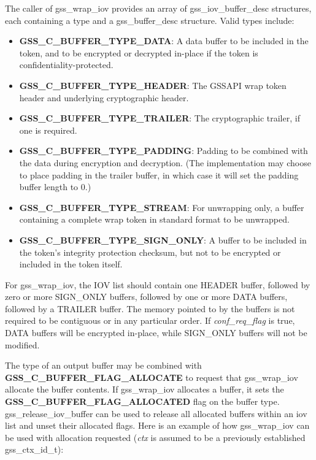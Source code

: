 \documentclass[letterpaper,10pt,english]{sphinxmanual}
\begin{document}
The caller of gss\_wrap\_iov provides an array of gss\_iov\_buffer\_desc
structures, each containing a type and a gss\_buffer\_desc structure.
Valid types include:
\begin{itemize}
\item {} 
\textbf{GSS\_C\_BUFFER\_TYPE\_DATA}: A data buffer to be included in the
token, and to be encrypted or decrypted in-place if the token is
confidentiality-protected.

\item {} 
\textbf{GSS\_C\_BUFFER\_TYPE\_HEADER}: The GSSAPI wrap token header and
underlying cryptographic header.

\item {} 
\textbf{GSS\_C\_BUFFER\_TYPE\_TRAILER}: The cryptographic trailer, if one is
required.

\item {} 
\textbf{GSS\_C\_BUFFER\_TYPE\_PADDING}: Padding to be combined with the data
during encryption and decryption.  (The implementation may choose to
place padding in the trailer buffer, in which case it will set the
padding buffer length to 0.)

\item {} 
\textbf{GSS\_C\_BUFFER\_TYPE\_STREAM}: For unwrapping only, a buffer
containing a complete wrap token in standard format to be unwrapped.

\item {} 
\textbf{GSS\_C\_BUFFER\_TYPE\_SIGN\_ONLY}: A buffer to be included in the
token's integrity protection checksum, but not to be encrypted or
included in the token itself.

\end{itemize}

For gss\_wrap\_iov, the IOV list should contain one HEADER buffer,
followed by zero or more SIGN\_ONLY buffers, followed by one or more
DATA buffers, followed by a TRAILER buffer.  The memory pointed to by
the buffers is not required to be contiguous or in any particular
order.  If \emph{conf\_req\_flag} is true, DATA buffers will be encrypted
in-place, while SIGN\_ONLY buffers will not be modified.

The type of an output buffer may be combined with
\textbf{GSS\_C\_BUFFER\_FLAG\_ALLOCATE} to request that gss\_wrap\_iov allocate
the buffer contents.  If gss\_wrap\_iov allocates a buffer, it sets the
\textbf{GSS\_C\_BUFFER\_FLAG\_ALLOCATED} flag on the buffer type.
gss\_release\_iov\_buffer can be used to release all allocated buffers
within an iov list and unset their allocated flags.  Here is an
example of how gss\_wrap\_iov can be used with allocation requested
(\emph{ctx} is assumed to be a previously established gss\_ctx\_id\_t):
\end{document}
